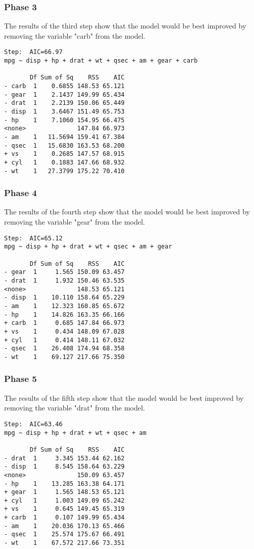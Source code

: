 \subsubsection{Phase 3}
The results of the third step show that the model would be best improved by removing the variable "carb" from the model.
\footnotesize
\begin{verbatim}
Step:  AIC=66.97
mpg ~ disp + hp + drat + wt + qsec + am + gear + carb

       Df Sum of Sq    RSS    AIC
- carb  1    0.6855 148.53 65.121
- gear  1    2.1437 149.99 65.434
- drat  1    2.2139 150.06 65.449
- disp  1    3.6467 151.49 65.753
- hp    1    7.1060 154.95 66.475
<none>              147.84 66.973
- am    1   11.5694 159.41 67.384
- qsec  1   15.6830 163.53 68.200
+ vs    1    0.2685 147.57 68.915
+ cyl   1    0.1883 147.66 68.932
- wt    1   27.3799 175.22 70.410
\end{verbatim}
\normalsize
\subsubsection{Phase 4}
The results of the fourth step show that the model would be best improved by removing the variable "gear" from the model.
\footnotesize
\begin{verbatim}
Step:  AIC=65.12
mpg ~ disp + hp + drat + wt + qsec + am + gear

       Df Sum of Sq    RSS    AIC
- gear  1     1.565 150.09 63.457
- drat  1     1.932 150.46 63.535
<none>              148.53 65.121
- disp  1    10.110 158.64 65.229
- am    1    12.323 160.85 65.672
- hp    1    14.826 163.35 66.166
+ carb  1     0.685 147.84 66.973
+ vs    1     0.434 148.09 67.028
+ cyl   1     0.414 148.11 67.032
- qsec  1    26.408 174.94 68.358
- wt    1    69.127 217.66 75.350
\end{verbatim}
\normalsize
\newpage
\subsubsection{Phase 5}
The results of the fifth step show that the model would be best improved by removing the variable "drat" from the model.
\footnotesize
\begin{verbatim}
Step:  AIC=63.46
mpg ~ disp + hp + drat + wt + qsec + am

       Df Sum of Sq    RSS    AIC
- drat  1     3.345 153.44 62.162
- disp  1     8.545 158.64 63.229
<none>              150.09 63.457
- hp    1    13.285 163.38 64.171
+ gear  1     1.565 148.53 65.121
+ cyl   1     1.003 149.09 65.242
+ vs    1     0.645 149.45 65.319
+ carb  1     0.107 149.99 65.434
- am    1    20.036 170.13 65.466
- qsec  1    25.574 175.67 66.491
- wt    1    67.572 217.66 73.351
\end{verbatim}
\normalsize
